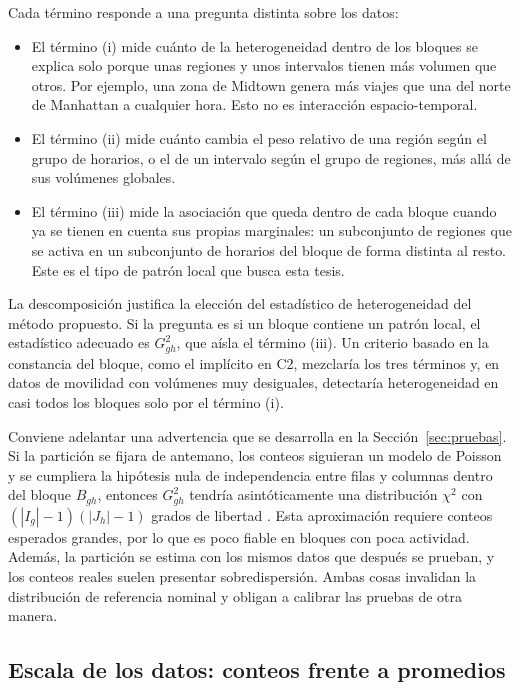 Cada término responde a una pregunta distinta sobre los datos:

\begin{itemize}
  \item El término (i) mide cuánto de la heterogeneidad dentro de los bloques se
        explica solo porque unas regiones y unos intervalos tienen más volumen
        que otros. Por ejemplo, una zona de Midtown genera más viajes que una del
        norte de Manhattan a cualquier hora. Esto no es interacción
        espacio-temporal.
  \item El término (ii) mide cuánto cambia el peso relativo de una región según el
        grupo de horarios, o el de un intervalo según el grupo de regiones, más
        allá de sus volúmenes globales.
  \item El término (iii) mide la asociación que queda dentro de cada bloque cuando
        ya se tienen en cuenta sus propias marginales: un subconjunto de regiones
        que se activa en un subconjunto de horarios del bloque de forma distinta
        al resto. Este es el tipo de patrón local que busca esta tesis.
\end{itemize}

La descomposición justifica la elección del estadístico de heterogeneidad del
método propuesto. Si la pregunta es si un bloque contiene un patrón local, el
estadístico adecuado es $G^2_{gh}$, que aísla el término (iii). Un criterio basado
en la constancia del bloque, como el implícito en C2, mezclaría los tres términos
y, en datos de movilidad con volúmenes muy desiguales, detectaría heterogeneidad
en casi todos los bloques solo por el término (i).

Conviene adelantar una advertencia que se desarrolla en la
Sección~\ref{sec:pruebas}. Si la partición se fijara de antemano, los
conteos siguieran un modelo de Poisson y se cumpliera la hipótesis nula de
independencia entre filas y columnas dentro del bloque $B_{gh}$, entonces
$G^2_{gh}$ tendría asintóticamente una distribución $\chi^2$ con
$(|I_g|-1)(|J_h|-1)$ grados de libertad \cite[Secs.~3.2.1 y~4.5.2]{Agresti2013}.
Esta aproximación requiere conteos esperados grandes, por lo que es poco fiable en
bloques con poca actividad. Además, la partición se estima con los mismos datos
que después se prueban, y los conteos reales suelen presentar sobredispersión.
Ambas cosas invalidan la distribución de referencia nominal y obligan a calibrar
las pruebas de otra manera.

\subsection{Escala de los datos: conteos frente a promedios}\label{sec:escala}

